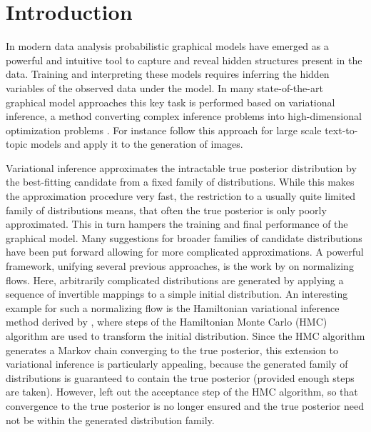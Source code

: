 \section{Introduction}

In modern data analysis probabilistic graphical models have emerged as a powerful and intuitive tool to capture and reveal hidden structures present in the data. Training and interpreting these models requires inferring the hidden variables of the observed data under the model. In many state-of-the-art graphical model approaches this key task is performed based on variational inference, a method converting complex inference problems into high-dimensional optimization problems \parencite{Jordan1999}. For instance \textcite{Hoffman2013} follow this approach for large scale text-to-topic models and \textcite{Gregor2015, Rezende2014, Kingma2014} apply it to the generation of images. 

Variational inference approximates the intractable true posterior distribution by the best-fitting candidate from a fixed family of distributions. While this makes the approximation procedure very fast, the restriction to a usually quite limited family of distributions means, that often the true posterior is only poorly approximated. This in turn hampers the training and final performance of the graphical model. Many suggestions for broader families of candidate distributions have been put forward allowing for more complicated approximations. A powerful framework, unifying several previous approaches, is the work by \textcite{Rezende2015} on normalizing flows. Here, arbitrarily complicated distributions are generated by applying a sequence of invertible mappings to a simple initial distribution. An interesting example for such a normalizing flow is the Hamiltonian variational inference method derived by \textcite{Salimans2014}, where steps of the Hamiltonian Monte Carlo (HMC) algorithm are used to transform the initial distribution. Since the HMC algorithm generates a Markov chain converging to the true posterior, this extension to variational inference is particularly appealing, because the generated family of distributions is guaranteed to contain the true posterior (provided enough steps are taken). However, \textcite{Salimans2014} left out the acceptance step of the HMC algorithm, so that convergence to the true posterior is no longer ensured and the true posterior need not be within the generated distribution family.

